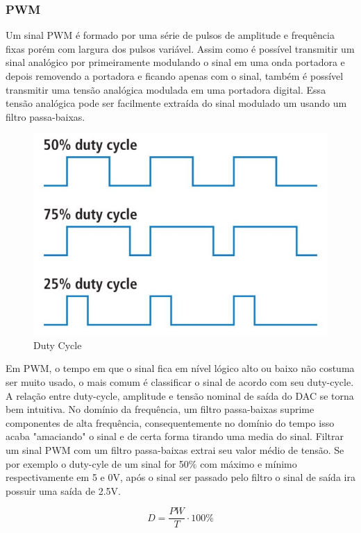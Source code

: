 \subsubsection*{PWM}
Um sinal PWM é formado por uma série de pulsos de amplitude e frequência fixas porém com largura dos pulsos variável. Assim como é possível transmitir um sinal analógico por primeiramente modulando o sinal em uma onda portadora e depois removendo a portadora e ficando apenas com o sinal, também é possível transmitir uma tensão analógica modulada em uma portadora digital. Essa tensão analógica pode ser facilmente extraída do sinal modulado um usando um filtro passa-baixas.
\begin{figure}[htbp]
    \centering
    \includegraphics[scale=0.3]{figuras/duty_cycle.jpg}
    \caption{Duty Cycle}
    \label{duty_cycle}
\end{figure}
Em PWM, o tempo em que o sinal fica em nível lógico alto ou baixo não costuma ser muito usado, o mais comum é classificar o sinal de acordo com seu duty-cycle. A relação entre duty-cycle, amplitude e tensão nominal de saída do DAC se torna bem intuitiva. No domínio da frequência, um filtro passa-baixas suprime componentes de alta frequência, consequentemente no domínio do tempo isso acaba "amaciando" o sinal e de certa forma tirando uma media do sinal. Filtrar um sinal PWM com um filtro passa-baixas extrai seu valor médio de tensão. Se por exemplo o duty-cyle de um sinal for 50\% com máximo e mínimo respectivamente em 5 e 0V, após o sinal ser passado pelo filtro o sinal de saída ira possuir uma saída de 2.5V.

\begin{equation}\label{calc-duty-cycle}
    D=\frac{ PW }{ T } \cdot 100 \%
\end{equation}

